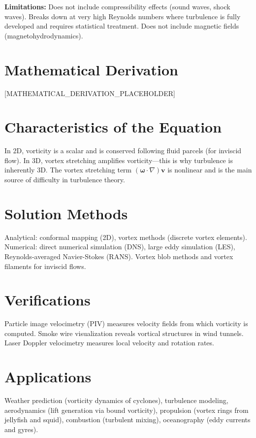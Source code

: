 \documentclass[11pt,openright]{book}
\begin{document}
\textbf{Limitations:} Does not include compressibility effects (sound waves, shock waves). Breaks down at very high Reynolds numbers where turbulence is fully developed and requires statistical treatment. Does not include magnetic fields (magnetohydrodynamics).


\section*{Mathematical Derivation}

[MATHEMATICAL_DERIVATION_PLACEHOLDER]

\section*{Characteristics of the Equation}

In 2D, vorticity is a scalar and is conserved following fluid parcels (for inviscid flow). In 3D, vortex stretching amplifies vorticity---this is why turbulence is inherently 3D. The vortex stretching term $(\boldsymbol{\omega} \cdot \nabla)\mathbf{v}$ is nonlinear and is the main source of difficulty in turbulence theory.
\section*{Solution Methods}

Analytical: conformal mapping (2D), vortex methods (discrete vortex elements). Numerical: direct numerical simulation (DNS), large eddy simulation (LES), Reynolds-averaged Navier-Stokes (RANS). Vortex blob methods and vortex filaments for inviscid flows.
\section*{Verifications}

Particle image velocimetry (PIV) measures velocity fields from which vorticity is computed. Smoke wire visualization reveals vortical structures in wind tunnels. Laser Doppler velocimetry measures local velocity and rotation rates.
\section*{Applications}

Weather prediction (vorticity dynamics of cyclones), turbulence modeling, aerodynamics (lift generation via bound vorticity), propulsion (vortex rings from jellyfish and squid), combustion (turbulent mixing), oceanography (eddy currents and gyres).
\end{document}
